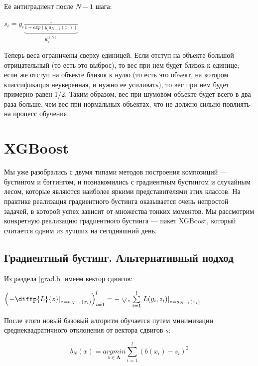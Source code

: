 \documentclass{article}
\theoremstyle{definition}
\theoremstyle{theorem}
\theoremstyle{remark}
\theoremstyle{theorem}
\theoremstyle{example}
\theoremstyle{theorem}
\theoremstyle{theorem}
\theoremstyle{theorem}
\theoremstyle{theorem}
\begin{document}
Ее антиградиент после $N-1$ шага:

$s_i = y_i \underbrace{\frac{1}{1+exp(y_ia_{N-1}(x_i))}}_{w_i^{(N)}}$

Теперь веса ограничены сверху единицей. Если отступ на объекте большой отрицательный (то есть это выброс), то вес при нем будет близок к единице; если же отступ на объекте близок к нулю (то есть это объект, на котором классификация неуверенная, и нужно ее усиливать), то вес при нем будет примерно равен 1/2. Таким образом,
вес при шумовом объекте будет всего в два раза больше, чем вес при нормальных объектах, что не должно сильно повлиять на процесс обучения.

\newpage

\section{XGBoost}

Мы уже разобрались с двумя типами методов построения композиций — бустингом и бэггингом, и познакомились с градиентным бустингом и случайным лесом, которые являются наиболее яркими представителями этих классов. На практике реализация градиентного бустинга оказывается очень непростой задачей, в которой
успех зависит от множества тонких моментов. Мы рассмотрим конкретную реализацию градиентного бустинга — пакет XGBoost, который считается одним из лучших на сегодняшний день.

\subsection{Градиентный бустинг. Альтернативный подход}

Из раздела  \ref{grad.b} имеем вектор сдвигов:

\vspace{0.1cm}

$\left(\left. -\diffp{L}{z}\right|_{z=a_{N-1}(x_i)}\right)^l_{i=1} = -\bigtriangledown_z \sum\limits_{i=1}^{l}\left. L(y_i,z_i) \right|_{z=a_{N-1}(x_i)}$

\vspace{0.1cm}

После этого новый базовый алгоритм обучается путем минимизации среднеквадратичного отклонения от вектора сдвигов $s$:

\vspace{0.1cm}

\begin{equation}\label{bnx}
	b_N(x) = \underset{b\in\mathbf{A}}{argmin}\sum\limits_{i=1}^{l} (b(x_i) - s_i)^2
\end{equation}
\end{document}
